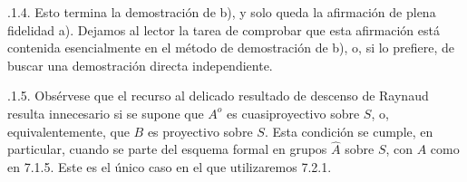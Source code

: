\medskip
{}.1.4. Esto termina la demostración de b), y solo queda la afirmación
de plena fidelidad a). Dejamos al lector la tarea de comprobar que esta
afirmación está contenida esencialmente en el método de demostración de
b), o, si lo prefiere, de buscar una demostración directa independiente.

\medskip
{}.1.5. Obsérvese que el recurso al delicado resultado de descenso de
Raynaud resulta innecesario si se supone que $A^o$ es cuasiproyectivo
sobre $S$, o, equivalentemente, que $B$ es proyectivo sobre $S$. Esta
condición se cumple, en particular, cuando se parte del esquema formal
en grupos $\widehat A$ sobre $S$, con $A$ como en 7.1.5. Este es el
único caso en el que utilizaremos 7.2.1.
